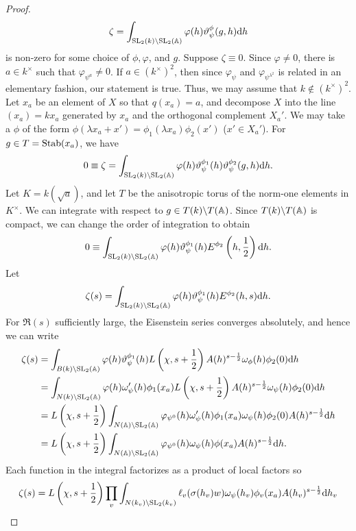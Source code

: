 \begin{proof}
\[
\zeta = \int_{\mathrm{SL}_2(k) \backslash \mathrm{SL}_2(\mathbb{A})} \varphi(h) \vartheta_\psi^\phi(g, h) \mathrm{d} h
\]
is non-zero for some choice of $\phi, \varphi$, and $g$.
Suppose $\zeta \equiv 0$.
Since $\varphi \neq 0$, there is $a \in k^\times$ such that $\varphi_{\psi^a} \neq 0$.
If $a \in (k^\times)^2$, then since $\varphi_{\psi}$ and $\varphi_{\psi^{\lambda^2}}$ is related in an elementary fashion, our statement is true.
Thus, we may assume that $k \not\in (k^\times)^2$.
Let $x_a$ be an element of $X$ so that $q(x_a) = a$, and decompose $X$ into the line $(x_a) = kx_a$ generated by $x_a$ and the orthogonal complement $X_a'$.
We may take a $\phi$ of the form $\phi(\lambda x_a + x') = \phi_1(\lambda x_a) \phi_2(x')$ ($x' \in X_a'$).
For $g \in T = \mathrm{Stab} (x_a)$, we have
\[
0 \equiv \zeta = \int_{\mathrm{SL}_2(k) \backslash \mathrm{SL}_2(\mathbb{A})} \varphi(h) \vartheta_\psi^{\phi_1}(h) \vartheta_{\psi}^{\phi_2}(g, h) \mathrm{d} h.
\]
Let $K = k(\sqrt{a})$, and let $T$ be the anisotropic torus of the norm-one elements in $K^\times$.
We can integrate with respect to $g\in T(k) \backslash T(\mathbb{A})$.
Since $T(k) \backslash T(\mathbb{A})$ is compact, we can change the order of integration to obtain
\[
0 \equiv \int_{\mathrm{SL}_2(k) \backslash \mathrm{SL}_2(\mathbb{A})} \varphi(h) \vartheta_\psi^{\phi_1}(h) E^{\phi_2}\left(h, \frac{1}{2}\right) \mathrm{d} h.
\]
Let
\[
\zeta(s) = \int_{\mathrm{SL}_2(k) \backslash \mathrm{SL}_2(\mathbb{A})} \varphi(h) \vartheta_\psi^{\phi_1}(h) E^{\phi_2}(h, s) \mathrm{d} h.
\]
For $\Re(s)$ sufficiently large, the Eisenstein series converges absolutely, and hence we can write
\begin{align*}
    \zeta(s) &= \int_{B(k) \backslash \mathrm{SL}_2(\mathbb{A})} \varphi(h) \vartheta_\psi^{\phi_1}(h) L\left(\chi, s + \frac{1}{2}\right) A(h)^{s - \frac{1}{2}} \omega_\phi(h) \phi_2(0) \mathrm{d} h \\
    &= \int_{N(k) \backslash \mathrm{SL}_2(\mathbb{A})} \varphi(h) \omega_\psi'(h) \phi_1(x_a) L\left(\chi, s + \frac{1}{2}\right)A(h)^{s - \frac{1}{2}} \omega_\psi(h) \phi_2(0) \mathrm{d} h \\
    &= L\left(\chi, s + \frac{1}{2}\right) \int_{N(\mathbb{A}) \backslash \mathrm{SL}_2(\mathbb{A})}\varphi_{\psi^{0}}(h) \omega_\psi'(h)\phi_1(x_a) \omega_\psi(h) \phi_2(0) A(h)^{s- \frac{1}{2}} \mathrm{d} h \\
    &= L \left(\chi, s + \frac{1}{2}\right) \int_{N(\mathbb{A}) \backslash \mathrm{SL}_2(\mathbb{A})} \varphi_{\psi^{0}}(h) \omega_\psi(h) \phi(x_a) A(h)^{s - \frac{1}{2}} \mathrm{d} h.
\end{align*}
Each function in the integral factorizes as a product of local factors so
\[
\zeta(s) = L\left(\chi, s + \frac{1}{2}\right) \prod_v \int_{N(k_v) \backslash \mathrm{SL}_2(k_v)} \ell_v(\sigma(h_v) w) \omega_\psi(h_v) \phi_v(x_a) A(h_v)^{s - \frac{1}{2}} \mathrm{d} h_v
\]
\end{proof}
